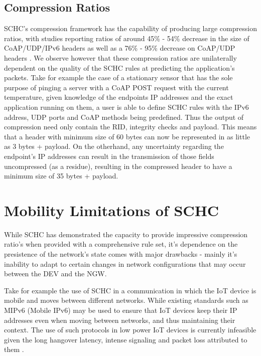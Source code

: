 \documentclass[12pt]{dalthesis}
\begin{document}
	\subsection{Compression Ratios}
	SCHC's compression framework has the capability of producing large compression ratios, with studies reporting
	ratios of around 45\% - 54\% decrease in the size of \\CoAP/UDP/IPv6 headers as well as a 76\% - 95\% decrease on CoAP/UDP headers \cite{Tomoskozi2022Packet}. We 
	observe however that these compression ratios are unilaterally dependent on the quality of the SCHC rules at predicting the 
	application's packets. Take for example the case of a stationary sensor that has the sole purpose of pinging 
	a server with a CoAP POST request with the current temperature, given knowledge of the
	endpoints IP addresses and the exact application running on them, a user is able to define SCHC rules with the IPv6 address, UDP ports and 
	CoAP methods being predefined.
	Thus the output of compression need only contain the RID, integrity checks and payload. This means that a header
	with minimum size of 60 bytes can now be represented in as little as 3 bytes + payload. On the otherhand, any uncertainty 
	regarding the endpoint's IP addresses can result in the transmission of those fields uncompressed (as a residue), resulting in the compressed header
	to have a minimum size of 35 bytes + payload.


\section{Mobility Limitations of SCHC}
		While SCHC has demonstrated the capacity to provide impressive compression ratio's when provided with a 
		comprehensive rule set, it's dependence on the presistence of the network's state comes with major drawbacks - mainly it's inability 
		to adapt to certain changes in network configurations that may occur between the DEV and the NGW. 


		Take for example the use of SCHC in a communication in which the IoT device is mobile and moves between different
		networks.
		While existing standards such as MIPv6 (Mobile IPv6) may be used to ensure that IoT devices
		keep their IP addresses even when moving between networks, and thus maintaining their context. The use of such
		protocols in low power IoT devices is currently infeasible given the long hangover latency, intense signaling and packet loss attributed to them 
		\cite{Ghaleb2016}. 
\end{document}
